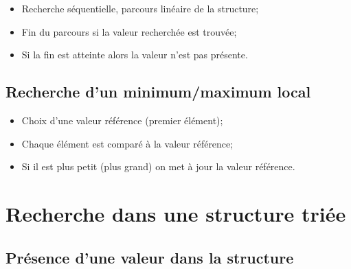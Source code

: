 \documentclass[12pt,a4paper]{article}
\begin{document}
\begin{itemize}
	\item Recherche séquentielle, parcours linéaire de la structure;
	\item Fin du parcours si la valeur recherchée est trouvée;
	\item Si la fin est atteinte alors la valeur n'est pas présente.
\end{itemize}

\begin{algorithm}[h!]
\end{algorithm}

\newpage

\subsection{Recherche d'un minimum/maximum local}

\begin{itemize}
	\item Choix d'une valeur référence (premier élément);
	\item Chaque élément est comparé à la valeur référence;
	\item Si il est plus petit (plus grand) on met à jour la valeur référence.
\end{itemize}

	\begin{algorithm}[h!]
	\end{algorithm}

\newpage

\section{Recherche dans une structure triée}


\subsection{Présence d'une valeur dans la structure}
\end{document}
